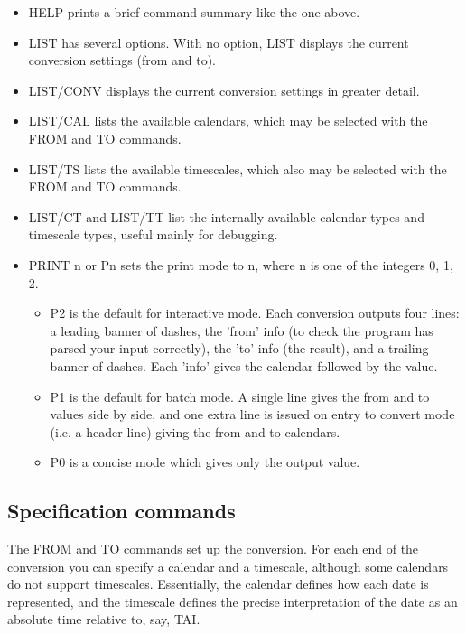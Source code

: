 \documentclass{article}
\begin{document}
\begin{itemize}

\item HELP prints a brief command summary like the one above.

\item LIST has several options. With no option, LIST
displays the current conversion settings (from and to). 

\item LIST/CONV displays the current conversion settings
in greater detail.

\item LIST/CAL lists the available calendars, which may be
selected with the FROM and TO commands.

\item LIST/TS lists the available timescales, which also may
be selected with the FROM and TO commands.

\item LIST/CT and LIST/TT list the internally available calendar
types and timescale types, useful mainly for debugging.

\item PRINT n or Pn sets the print mode to n, where n is
one of the integers 0, 1, 2.
\begin{itemize}
\item P2 is the default for interactive mode. 
Each conversion outputs four lines:
a leading banner of dashes, the 'from' info (to check the
program has parsed your input correctly), the 'to' info
(the result), and a trailing banner of dashes. Each 'info'
gives the calendar followed by the value.

\item P1 is the default for batch mode. A single line
gives the from and to values side by side, and one extra
line is issued on entry to convert mode (i.e. a header line)
giving the from and to calendars.

\item P0 is a concise mode which gives only the output value.
\end{itemize}

\end{itemize}

\subsection{Specification commands}

The FROM and TO commands set up the conversion. For each end
of the conversion you can specify a calendar and a timescale,
although some calendars do not support timescales. Essentially,
the calendar defines how each date is represented, and the
timescale defines the precise interpretation of the date
as an absolute time relative to, say, TAI.
\end{document}
